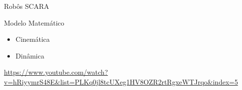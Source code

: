 \begin{frame}[c]{Robôs SCARA}


\end{frame}
\begin{frame}[c]{Modelo Matemático} 
    \begin{itemize}
        \item Cinemática
        \item Dinâmica
    \end{itemize}
    \url{https://www.youtube.com/watch?v=hRiyymrS48E&list=PLKq0jl8tcUXeg1HV8OZR2rtRgxeWTJrqo&index=5}
\end{frame}
